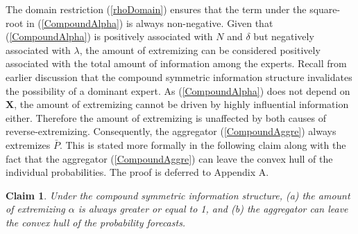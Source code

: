 \documentclass[11pt]{article}
\newtheorem{claim}[theorem]{Claim}
\theoremstyle{definition}
\theoremstyle{definition}
\begin{document}
The domain restriction (\ref{rhoDomain}) ensures that the term under the square-root in (\ref{CompoundAlpha}) is always non-negative.  
Given that (\ref{CompoundAlpha}) is positively associated with $N$ and $\delta$ but negatively associated with $\lambda$, the amount of extremizing can be considered positively associated with the total amount of information among the experts. Recall from earlier discussion that the compound symmetric information structure invalidates the possibility of a dominant expert. As (\ref{CompoundAlpha}) does not depend on $\boldsymbol{X}$, the amount of extremizing cannot be driven by highly influential information either. Therefore the amount of extremizing is unaffected by both causes of reverse-extremizing. Consequently, the aggregator (\ref{CompoundAggre}) always extremizes $\bar{P}$.   This is stated more formally in the following claim along with the fact that the aggregator (\ref{CompoundAggre}) can leave the convex hull of the individual probabilities. The proof is deferred to Appendix A. 

\begin{claim}
\label{positiveThm}
Under the compound symmetric information structure, (a) the amount of extremizing $\alpha$ is always greater or equal to 1, and (b) the aggregator can leave the convex hull of the probability forecasts. 
\end{claim}
\end{document}
